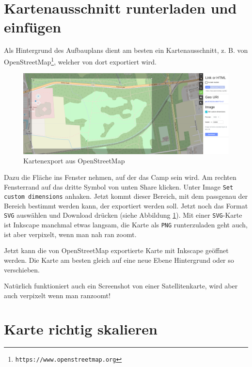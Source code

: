 \documentclass[letterpaper,12pt,
				parkskip = half]{article}
\begin{document}
\section{Kartenausschnitt runterladen und einfügen}
\label{kartenabschnitt}

Als Hintergrund des Aufbauplans dient am besten ein Kartenausschnitt, z. B. von OpenStreetMap\footnote{\texttt{https://www.openstreetmap.org}}, welcher von dort exportiert wird.

\begin{figure}[!h]

	\includegraphics[width=\textwidth]{Images/exportosm.png}

	\caption{Kartenexport aus OpenStreetMap}

	\label{fig:exportosm}
\end{figure}

Dazu die Fläche ins Fenster nehmen, auf der das Camp sein wird. Am rechten Fensterrand auf das dritte Symbol von unten \flqq{}Share\frqq{} klicken. Unter \flqq{}Image\frqq{} \texttt{Set custom dimensions} anhaken. Jetzt kommt dieser Bereich, mit dem passgenau der Bereich bestimmt werden kann, der exportiert werden soll. Jetzt noch das Format \texttt{SVG} auswählen und \flqq{}Download\frqq{} drücken (siehe Abbildung \ref{fig:exportosm}). 
Mit einer \texttt{SVG}-Karte ist Inkscape manchmal etwas langsam, die Karte als \texttt{PNG} runterzuladen geht auch, ist aber verpixelt, wenn man nah ran zoomt. 

Jetzt kann die von OpenStreetMap exportierte Karte mit Inkscape geöffnet werden. Die Karte am besten gleich auf eine neue Ebene \flqq{}Hintergrund\frqq{} oder so verschieben.

Natürlich funktioniert auch ein Screenshot von einer Satellitenkarte, wird aber auch verpixelt wenn man ranzoomt!

\section{Karte richtig skalieren}
\end{document}
